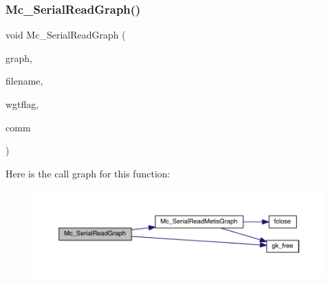 \subsubsection{\texorpdfstring{Mc\+\_\+\+Serial\+Read\+Graph()}{Mc\_SerialReadGraph()}}
{\footnotesize\ttfamily void Mc\+\_\+\+Serial\+Read\+Graph (\begin{DoxyParamCaption}\item[{\hyperlink{a00734}{graph\+\_\+t} $\ast$}]{graph,  }\item[{char $\ast$}]{filename,  }\item[{\hyperlink{a00876_aaa5262be3e700770163401acb0150f52}{idx\+\_\+t} $\ast$}]{wgtflag,  }\item[{M\+P\+I\+\_\+\+Comm}]{comm }\end{DoxyParamCaption})}

Here is the call graph for this function\+:\nopagebreak
\begin{figure}[H]
\begin{center}
\leavevmode
\includegraphics[width=350pt]{a00861_a51cf512b2713a4b6397016836e9e653e_cgraph}
\end{center}
\end{figure}
\mbox{\label{a00861_ab618501d6d645eabdbe89cc62d33a54f}} 
